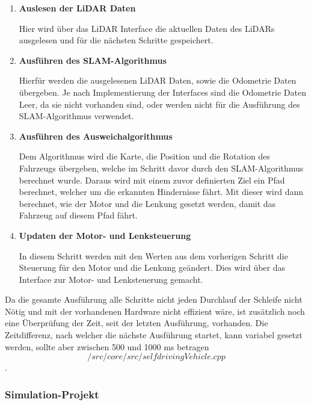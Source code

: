 \begin{enumerate}[leftmargin=*]

    \item \textbf{Auslesen der LiDAR Daten} 

    Hier wird über das LiDAR Interface die aktuellen Daten des LiDARs ausgelesen und für die nächsten Schritte gespeichert.

    \item \textbf{Ausführen des SLAM-Algorithmus} 
    
    Hierfür werden die ausgelesenen LiDAR Daten, sowie die Odometrie Daten übergeben. Je nach Implementierung der Interfaces sind die Odometrie Daten Leer, da sie nicht vorhanden sind, oder werden nicht für die Ausführung des SLAM-Algorithmus verwendet. 

    \item \textbf{Ausführen des Ausweichalgorithmus}
    
    Dem Algorithmus wird die Karte, die Position und die Rotation des Fahrzeugs übergeben, welche im Schritt davor durch den SLAM-Algorithmus berechnet wurde. Daraus wird mit einem zuvor definierten Ziel ein Pfad berechnet, welcher um die erkannten Hindernisse fährt. Mit dieser wird dann berechnet, wie der Motor und die Lenkung gesetzt werden, damit das Fahrzeug auf diesem Pfad fährt. 

    \item \textbf{Updaten der Motor- und Lenksteuerung} 

    In diesem Schritt werden mit den Werten aus dem vorherigen Schritt die Steuerung für den Motor und die Lenkung geändert. Dies wird über das Interface zur Motor- und Lenksteuerung gemacht. 

\end{enumerate}

Da die gesamte Ausführung alle Schritte nicht jeden Durchlauf der Schleife nicht Nötig und mit der vorhandenen Hardware nicht effizient wäre, ist zusätzlich noch eine Überprüfung der Zeit, seit der letzten Ausführung, vorhanden. Die Zeitdifferenz, nach welcher die nächste Ausführung startet, kann variabel gesetzt werden, sollte aber zwischen 500 und 1000 ms betragen \[/src/core/src/selfdrivingVehicle.cpp\]. 

\subsubsection{Simulation-Projekt}

